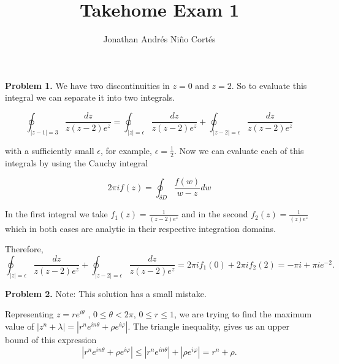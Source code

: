 \documentclass[letterpaper,twoside,11pt]{article}
\title{Takehome Exam 1}
\author{Jonathan Andr\'es Ni\~no Cort\'es}
\begin{document}
\maketitle
\textbf{Problem 1.} We have two discontinuities in $z=0$ and $z=2$. So to evaluate this integral we can separate it into two integrals.

\begin{equation}
\oint_{|z-1|=3} \frac{dz}{z(z-2)e^z} = \oint_{|z|=\epsilon} \frac{dz}{z(z-2)e^z} + \oint_{|z-2|=\epsilon} \frac{dz}{z(z-2)e^z} \nonumber 
\end{equation}

with a sufficiently small $\epsilon$, for example, $\epsilon=\frac{1}{2}$. Now we can evaluate each of this integrals by using the Cauchy integral

\begin{equation}
2\pi i f(z)=\oint_{\delta D}\frac{f(w)}{w-z}dw \nonumber 
\end{equation}

In the first integral we take $f_1(z)=\frac{1}{(z-2)e^z}$ and in the second $f_2(z)=\frac{1}{(z)e^z}$ which in both cases are analytic in their respective integration domains.

Therefore, 
\begin{equation}
\oint_{|z|=\epsilon} \frac{dz}{z(z-2)e^z} + \oint_{|z-2|=\epsilon} \frac{dz}{z(z-2)e^z}= 2 \pi i f_1(0)+2 \pi i f_2(2) = -\pi i + \pi i e^{-2}. \nonumber
\end{equation}

\newpage
\textbf{Problem 2.} Note: This solution has a small mistake.

Representing $z= r e^{i\theta}$ , $0 \leq \theta < 2 \pi$, $0\leq r\leq 1$, we are trying to find the maximum value of $|z^n+\lambda|=|r^ne^{in\theta}+\rho e^{i\varphi}|$. The triangle inequality, gives us an upper bound of this expression
\begin{equation}
|r^ne^{in\theta}+\rho e^{i\varphi}| \leq |r^ne^{in\theta}|+|\rho e^{i\varphi}|=r^n + \rho. \nonumber
\end{equation}
\end{document}

